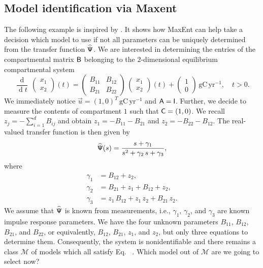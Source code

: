 \documentclass[smallextended]{svjour3}
\makeatletter
\renewcommand*{\eqref}[1]{%
  \hyperref[{#1}]{\textup{\tagform@{\ref*{#1}}}}%
}
\newcommand{\deriv}[1]{\frac{\operatorname{d}}{\operatorname{d}#1}}
\newcommand{\gC}{\mathrm{gC}}
\newcommand{\yr}{\mathrm{yr}}
\newcommand{\ie}{i.e.}
\makeatother
\begin{document}
\subsection{Model identification via Maxent}
  \label{sec:moel_identification}
  The following example is inspired by \citet[Example~16\,C]{Anderson1983}.
  It shows how MaxEnt can help take a decision which model to use if not all parameters can be uniquely determined from the transfer function $\widehat{\mathsf{\Psi}}$.
	We are interested in determining the entries of the compartmental matrix $\mathsf{B}$ belonging to the $2$-dimensional equilibrium compartmental system
	\begin{equation}\label{eqn:opt_example}
        \deriv{t}\,
		\begin{pmatrix} x_1 \\ x_2 \end{pmatrix}(t)
		=
		\begin{pmatrix} B_{11} & B_{12} \\ B_{21} & B_{22} \end{pmatrix}\,
		\begin{pmatrix} x_1 \\ x_2 \end{pmatrix}(t)
		+
		\begin{pmatrix} 1 \\ 0 \end{pmatrix}\,\gC\,\yr^{-1},
		\quad t>0.
	\end{equation}
	We immediately notice $\vec{u}=(1,0)^T\,\gC\,\yr^{-1}$ and $\mathsf{A}=\mathsf{I}$.
	Further, we decide to measure the contents of compartment $1$ such that $\mathsf{C} = (1,0)$.
	We recall $z_j = -\sum_{i=1}^d B_{ij}$ and obtain $z_1 = -B_{11} - B_{21}$ and $z_2 = - B_{22} - B_{12}$.
	The real-valued transfer function is then given by
	\begin{equation*}
		\widehat{\mathsf{\Psi}}(s) = \frac{s + \gamma_1}{s^2+\gamma_2\,s+\gamma_3},
	\end{equation*}
	where
	\begin{equation}\label{eqn:measurement_data}
		\begin{aligned}
			\gamma_1 &= B_{12} + z_2,\\
			\gamma_2 &= B_{21} + z_1 + B_{12} + z_2,\\
			\gamma_3 &= z_1\,B_{12} + z_1\,z_2 + B_{21}\,z_2.
		\end{aligned}
	\end{equation}
	We assume that $\widehat{\mathsf{\Psi}}$ is known from measurements, \ie, $\gamma_1$, $\gamma_2$, and $\gamma_3$ are known impulse response parameters.	
	We have the four unknown parameters $B_{11}$, $B_{12}$, $B_{21}$, and $B_{22}$, or equivalently, $B_{12}$, $B_{21}$, $z_1$, and $z_2$, but only three equations to determine them.
	Consequently, the system is nonidentifiable and there remains a class $\mathcal{M}$ of models which all satisfy Eq.~\eqref{eqn:measurement_data}.
	Which model out of $\mathcal{M}$ are we going to select now?
\end{document}
